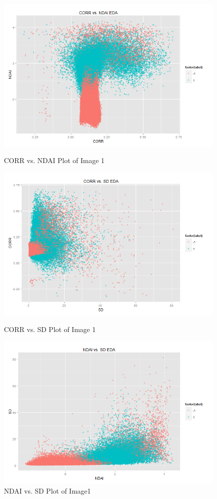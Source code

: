 \documentclass{article}\usepackage[]{graphicx}\usepackage[]{color}
\begin{document}
\begin{figure}[H]
  \includegraphics[width=\linewidth]{CORRvsNDAI.png}
  \caption{CORR vs. NDAI Plot of Image 1}\label{}
\endminipage\hfill
{}
  \includegraphics[width=\linewidth]{CORRvsSD.png}
  \caption{CORR vs. SD Plot of Image 1}\label{}
\endminipage\hfill
{}%
  \includegraphics[width=\linewidth]{NDAIvsSD.png}
  \caption{NDAI vs. SD Plot of Image1}\label{}
\endminipage
\end{figure}
\end{document}

